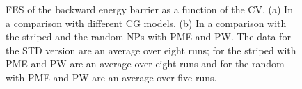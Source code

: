 \begin{figure}[pth]
\begin{adjustwidth}{-1.5cm}{-0.5cm}
		\caption{\acs{FES} of the backward energy barrier as a function of the \acs{CV}. (a) In a comparison with different \acs{CG} models. (b) In a comparison with the striped and the random \acp{NP} with \acs{PME} and \acs{PW}. The data for the STD version are an average over eight runs; for the striped with \ac{PME} and \acs{PW} are an average over eight runs and for the random with \ac{PME} and \acs{PW} are an average over five runs.}%
		\label{fig:backwardWall}
	\end{adjustwidth}
\end{figure}

